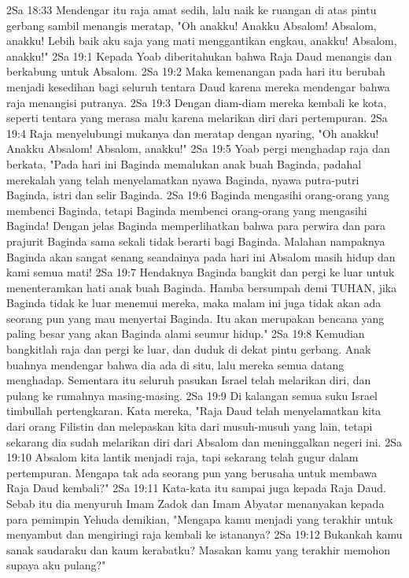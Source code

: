 2Sa 18:33  Mendengar itu raja amat sedih, lalu naik ke ruangan di atas pintu gerbang sambil menangis meratap, "Oh anakku! Anakku Absalom! Absalom, anakku! Lebih baik aku saja yang mati menggantikan engkau, anakku! Absalom, anakku!"
2Sa 19:1  Kepada Yoab diberitahukan bahwa Raja Daud menangis dan berkabung untuk Absalom.
2Sa 19:2  Maka kemenangan pada hari itu berubah menjadi kesedihan bagi seluruh tentara Daud karena mereka mendengar bahwa raja menangisi putranya.
2Sa 19:3  Dengan diam-diam mereka kembali ke kota, seperti tentara yang merasa malu karena melarikan diri dari pertempuran.
2Sa 19:4  Raja menyelubungi mukanya dan meratap dengan nyaring, "Oh anakku! Anakku Absalom! Absalom, anakku!"
2Sa 19:5  Yoab pergi menghadap raja dan berkata, "Pada hari ini Baginda memalukan anak buah Baginda, padahal merekalah yang telah menyelamatkan nyawa Baginda, nyawa putra-putri Baginda, istri dan selir Baginda.
2Sa 19:6  Baginda mengasihi orang-orang yang membenci Baginda, tetapi Baginda membenci orang-orang yang mengasihi Baginda! Dengan jelas Baginda memperlihatkan bahwa para perwira dan para prajurit Baginda sama sekali tidak berarti bagi Baginda. Malahan nampaknya Baginda akan sangat senang seandainya pada hari ini Absalom masih hidup dan kami semua mati!
2Sa 19:7  Hendaknya Baginda bangkit dan pergi ke luar untuk menenteramkan hati anak buah Baginda. Hamba bersumpah demi TUHAN, jika Baginda tidak ke luar menemui mereka, maka malam ini juga tidak akan ada seorang pun yang mau menyertai Baginda. Itu akan merupakan bencana yang paling besar yang akan Baginda alami seumur hidup."
2Sa 19:8  Kemudian bangkitlah raja dan pergi ke luar, dan duduk di dekat pintu gerbang. Anak buahnya mendengar bahwa dia ada di situ, lalu mereka semua datang menghadap. Sementara itu seluruh pasukan Israel telah melarikan diri, dan pulang ke rumahnya masing-masing.
2Sa 19:9  Di kalangan semua suku Israel timbullah pertengkaran. Kata mereka, "Raja Daud telah menyelamatkan kita dari orang Filistin dan melepaskan kita dari musuh-musuh yang lain, tetapi sekarang dia sudah melarikan diri dari Absalom dan meninggalkan negeri ini.
2Sa 19:10  Absalom kita lantik menjadi raja, tapi sekarang telah gugur dalam pertempuran. Mengapa tak ada seorang pun yang berusaha untuk membawa Raja Daud kembali?"
2Sa 19:11  Kata-kata itu sampai juga kepada Raja Daud. Sebab itu dia menyuruh Imam Zadok dan Imam Abyatar menanyakan kepada para pemimpin Yehuda demikian, "Mengapa kamu menjadi yang terakhir untuk menyambut dan mengiringi raja kembali ke istananya?
2Sa 19:12  Bukankah kamu sanak saudaraku dan kaum kerabatku? Masakan kamu yang terakhir memohon supaya aku pulang?"
